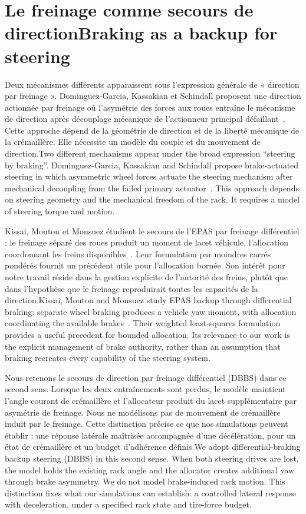 \documentclass[11pt,a4paper,oneside]{report}
\newcommand{\bi}[2]{\iffrench #2\else #1\fi}
\renewcommand{\sec}[2]{\section{\bi{#1}{#2}}}
\begin{document}
\sec{Braking as a backup for steering}{Le freinage comme secours de direction}
\bi{Two different mechanisms appear under the broad expression ``steering by braking''. Dominguez-Garcia, Kassakian and Schindall propose brake-actuated steering in which asymmetric wheel forces actuate the steering mechanism after mechanical decoupling from the failed primary actuator~\cite{pesc}. This approach depends on steering geometry and the mechanical freedom of the rack. It requires a model of steering torque and motion.}{Deux mécanismes différents apparaissent sous l'expression générale de « direction par freinage ». Dominguez-Garcia, Kassakian et Schindall proposent une direction actionnée par freinage où l'asymétrie des forces aux roues entraîne le mécanisme de direction après découplage mécanique de l'actionneur principal défaillant~\cite{pesc}. Cette approche dépend de la géométrie de direction et de la liberté mécanique de la crémaillère. Elle nécessite un modèle du couple et du mouvement de direction.}

\bi{Kissai, Mouton and Monsuez study EPAS backup through differential braking: separate wheel braking produces a vehicle yaw moment, with allocation coordinating the available brakes~\cite{kissai}. Their weighted least-squares formulation provides a useful precedent for bounded allocation. Its relevance to our work is the explicit management of brake authority, rather than an assumption that braking recreates every capability of the steering system.}{Kissai, Mouton et Monsuez étudient le secours de l'EPAS par freinage différentiel : le freinage séparé des roues produit un moment de lacet véhicule, l'allocation coordonnant les freins disponibles~\cite{kissai}. Leur formulation par moindres carrés pondérés fournit un précédent utile pour l'allocation bornée. Son intérêt pour notre travail réside dans la gestion explicite de l'autorité des freins, plutôt que dans l'hypothèse que le freinage reproduirait toutes les capacités de la direction.}

\bi{We adopt differential-braking backup steering (DBBS) in this second sense. When both steering drives are lost, the model holds the existing rack angle and the allocator creates additional yaw through brake asymmetry. We do not model brake-induced rack motion. This distinction fixes what our simulations can establish: a controlled lateral response with deceleration, under a specified rack state and tire-force budget.}{Nous retenons le secours de direction par freinage différentiel (DBBS) dans ce second sens. Lorsque les deux entraînements sont perdus, le modèle maintient l'angle courant de crémaillère et l'allocateur produit du lacet supplémentaire par asymétrie de freinage. Nous ne modélisons pas de mouvement de crémaillère induit par le freinage. Cette distinction précise ce que nos simulations peuvent établir : une réponse latérale maîtrisée accompagnée d'une décélération, pour un état de crémaillère et un budget d'adhérence définis.}
\end{document}
